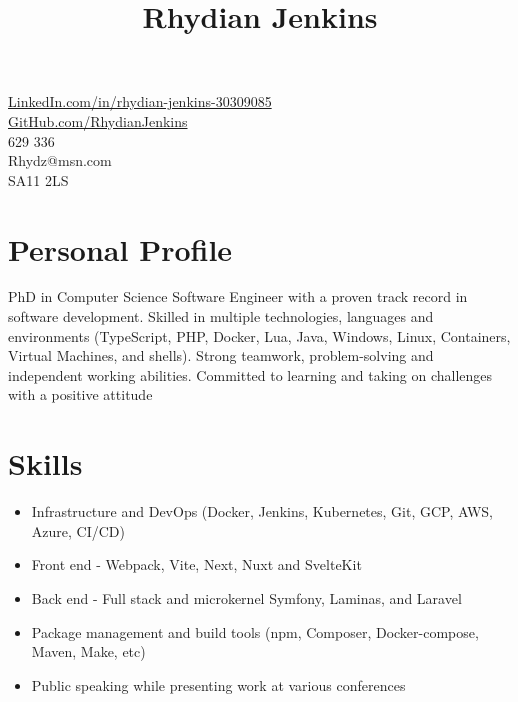\documentclass[10pt]{article}
\title{\bfseries\Huge Rhydian Jenkins}
\date{}
\author{}
\begin{document}
\maketitle \vspace{-7em}

\section*{}
\faLinkedin \quad \href{https://www.linkedin.com/in/rhydian-jenkins-30309085/}{LinkedIn.com/in/rhydian-jenkins-30309085}\\
\faGithub \quad \href{https://github.com/RhydianJenkins}{GitHub.com/RhydianJenkins}\\
\faPhone {} 629 336\\
\faEnvelope \quad Rhydz@msn.com\\
\faMapMarker \quad SA11 2LS

\section*{Personal Profile}
PhD in Computer Science Software Engineer with a proven track record in software development. Skilled in multiple technologies, languages and environments
(TypeScript, PHP, Docker, Lua, Java, Windows, Linux, Containers, Virtual Machines, and shells). Strong teamwork, problem-solving and independent working abilities.
Committed to learning and taking on challenges with a positive attitude

\section*{Skills}
\begin{itemize} \setlength\itemsep{-0.25em}
    \item Infrastructure and DevOps (Docker, Jenkins, Kubernetes, Git, GCP, AWS, Azure, CI/CD)
    \item Front end - Webpack, Vite, Next, Nuxt and SvelteKit
	\item Back end - Full stack and microkernel Symfony, Laminas, and Laravel
    \item Package management and build tools (npm, Composer, Docker-compose, Maven, Make, etc)
	\item Public speaking while presenting work at various conferences
\end{itemize}

\end{document}
